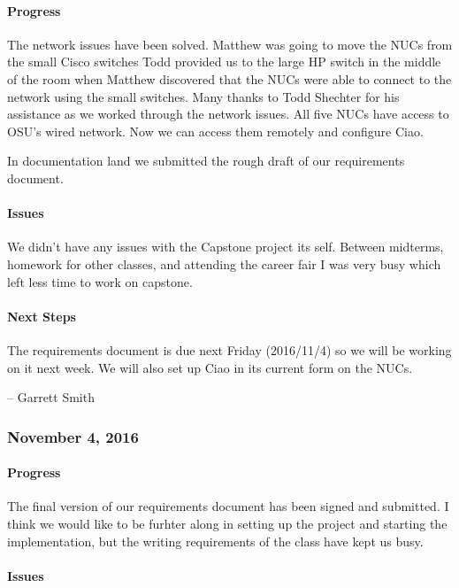 \documentclass[10pt,onecolumn,journal,draftclsnofoot]{IEEEtran}
\begin{document}
\paragraph{Progress} 

The network issues have been solved. Matthew was going to move the NUCs
from the small Cisco switches Todd provided us to the large HP switch in
the middle of the room when Matthew discovered that the NUCs were able
to connect to the network using the small switches. Many thanks to Todd
Shechter for his assistance as we worked through the network issues. All
five NUCs have access to OSU's wired network. Now we can access them
remotely and configure Ciao.

In documentation land we submitted the rough draft of our requirements
document.

\paragraph{Issues} 

We didn't have any issues with the Capstone project its self. Between
midterms, homework for other classes, and attending the career fair I
was very busy which left less time to work on capstone.

\paragraph{Next Steps} 

The requirements document is due next Friday (2016/11/4) so we will be
working on it next week. We will also set up Ciao in its current form on
the NUCs.

-- Garrett Smith

\subsubsection{November 4, 2016} 

\paragraph{Progress} 

The final version of our requirements document has been signed and
submitted. I think we would like to be furhter along in setting up the
project and starting the implementation, but the writing requirements of
the class have kept us busy.

\paragraph{Issues} 
\end{document}
